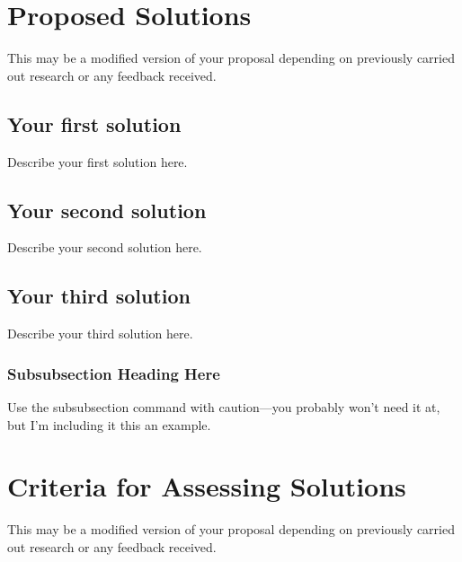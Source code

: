 \documentclass[peerreview]{IEEEtran}
\begin{document}

\section{Proposed Solutions}
This may be a modified version of your proposal depending on previously carried out research or any feedback received.
\subsection{Your first solution}
Describe your first solution here.
\subsection{Your second solution}
Describe your second solution here.
\subsection{Your third solution}
Describe your third solution here.
\subsubsection{Subsubsection Heading Here}
Use the subsubsection command with caution---you probably won't need it at, but I'm including it this an example.

\section{Criteria for Assessing Solutions} \label{sec:criteria}
This may be a modified version of your proposal depending on previously carried out research or any feedback received.
\end{document}
